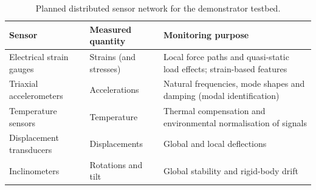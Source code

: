 \begin{table}[htbp]
\centering
\caption{Planned distributed sensor network for the demonstrator testbed.}
\label{tab:sensors}
\begin{tabularx}{\linewidth}{@{}l l X@{}}
\toprule
\textbf{Sensor} & \textbf{Measured quantity} & \textbf{Monitoring purpose} \\
\midrule
Electrical strain gauges  & Strains (and stresses)   & Local force paths and quasi-static load effects; strain-based features \\
Triaxial accelerometers   & Accelerations            & Natural frequencies, mode shapes and damping (modal identification) \\
Temperature sensors       & Temperature              & Thermal compensation and environmental normalisation of signals \\
Displacement transducers  & Displacements            & Global and local deflections \\
Inclinometers             & Rotations and tilt       & Global stability and rigid-body drift \\
\bottomrule
\end{tabularx}
\end{table}
